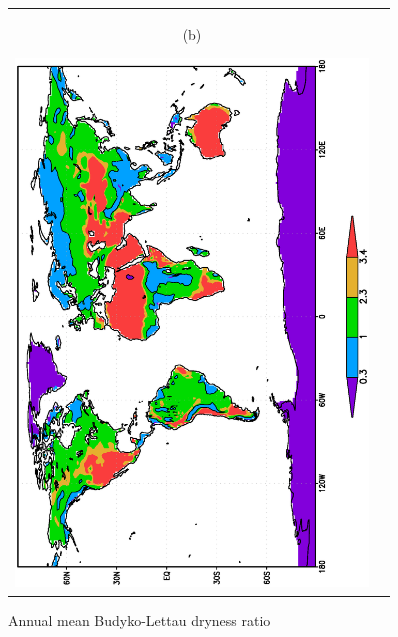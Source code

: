 \documentclass[12pt,a4paper,twoside,openright,headinclude,liststotoc,bibtotoc]{scrreprt}
\begin{document}
\begin{figure}[c]
\begin{tabular}{cc}
\begin{minipage}{1.0\textwidth}
\begin{center}
\begin{scriptsize}(b)\end{scriptsize}\hspace{-1cm}\includegraphics[height=14.0cm,angle=-90]{eps/budyko_ERA40_ANMnn.eps}
\end{center}
\end{minipage}
\end{tabular}
\caption[Annual mean Budyko-Lettau dryness ratio]{Annual mean Budyko-Lettau dryness ratio}
\label{img:budyko}
\end{figure}
\end{document}
